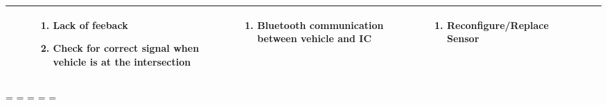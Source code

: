 \documentclass [10pt]{article}
\begin{document}
{\begin{minipage}{\textwidth}
\begin{longtable}{ |p{ }  | p{ } |  p{ } |  p{ } | p{ } | p{ } |  p{ }|}
\begin{minipage}{.22\textwidth}
\begin{enumerate}
                \end{enumerate}
        \end{minipage}
    & \cellcolor{tableCell}\begin{minipage}{.18\textwidth} 
                \begin{enumerate}
                    \item Lack of feeback
                    \item Check for correct signal when vehicle is at the intersection\vspace {1mm}
                \end{enumerate}
        \end{minipage}
    & \cellcolor{tableCell}\begin{minipage}{.22\textwidth} 
                \vspace{2mm}
                \begin{enumerate}
                    \item Bluetooth communication between vehicle and IC \vspace {1mm}
                \end{enumerate}
        \end{minipage}
    
    
    & \cellcolor{tableCell}\begin{minipage}{.24 \columnwidth} 
                \vspace{2mm}
                \begin{enumerate}
                    \item Reconfigure/Replace Sensor \vspace {1mm}
                \end{enumerate}
        \end{minipage} \\ \hline
 
    
    
    
 
 
 \end{longtable}
    
    
    
    \end{minipage}}





\begin{landscape}
\end{landscape}
\endgroup


\newpage
\paperwidth=\pdfpageheight
\paperheight=\pdfpagewidth
\pdfpageheight=\paperheight
\pdfpagewidth=\paperwidth
\headwidth=\textwidth
\end{document}
